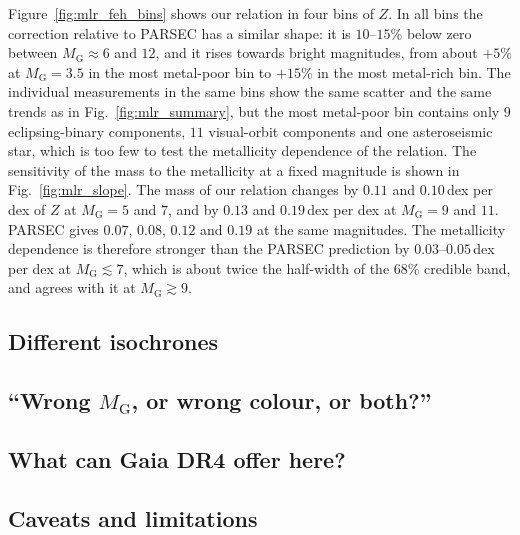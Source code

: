 \documentclass{aa}
\begin{document}
Figure~\ref{fig:mlr_feh_bins} shows our relation in four bins of $Z$. In all bins the correction relative to PARSEC has a similar shape: it is $10$--$15\%$ below zero between $M_{\mathrm{G}}\approx6$ and $12$, and it rises towards bright magnitudes, from about $+5\%$ at $M_{\mathrm{G}}=3.5$ in the most metal-poor bin to $+15\%$ in the most metal-rich bin. The individual measurements in the same bins show the same scatter and the same trends as in Fig.~\ref{fig:mlr_summary}, but the most metal-poor bin contains only $9$ eclipsing-binary components, $11$ visual-orbit components and one asteroseismic star, which is too few to test the metallicity dependence of the relation. The sensitivity of the mass to the metallicity at a fixed magnitude is shown in Fig.~\ref{fig:mlr_slope}. The mass of our relation changes by $0.11$ and $0.10$\,dex per dex of $Z$ at $M_{\mathrm{G}}=5$ and $7$, and by $0.13$ and $0.19$\,dex per dex at $M_{\mathrm{G}}=9$ and $11$. PARSEC gives $0.07$, $0.08$, $0.12$ and $0.19$ at the same magnitudes. The metallicity dependence is therefore stronger than the PARSEC prediction by $0.03$--$0.05$\,dex per dex at $M_{\mathrm{G}}\lesssim7$, which is about twice the half-width of the $68\%$ credible band, and agrees with it at $M_{\mathrm{G}}\gtrsim9$.

\subsection{Different isochrones}\label{sec:disc_isochrones}

\subsection{``Wrong $M_{\mathrm{G}}$, or wrong colour, or both?''}\label{sec:disc_mg}

\subsection{What can Gaia DR4 offer here?}

\subsection{Caveats and limitations}
\end{document}
